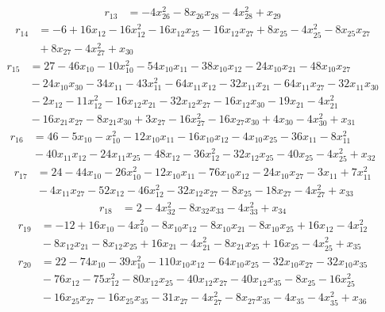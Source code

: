 \[\begin{aligned}
r_{13}&=-4x_{26}^{2}-8x_{26}x_{28}-4x_{28}^{2}+x_{29}
\end{aligned}\]
\[\begin{aligned}
r_{14}&=-6+16x_{12}-16x_{12}^{2}-16x_{12}x_{25}-16x_{12}x_{27}+8x_{25}-4x_{25}^{2}-8x_{25}x_{27}\\
&{}+8x_{27}-4x_{27}^{2}+x_{30}
\end{aligned}\]
\[\begin{aligned}
r_{15}&=27-46x_{10}-10x_{10}^{2}-54x_{10}x_{11}-38x_{10}x_{12}-24x_{10}x_{21}-48x_{10}x_{27}\\
&{}-24x_{10}x_{30}-34x_{11}-43x_{11}^{2}-64x_{11}x_{12}-32x_{11}x_{21}-64x_{11}x_{27}-32x_{11}x_{30}\\
&{}-2x_{12}-11x_{12}^{2}-16x_{12}x_{21}-32x_{12}x_{27}-16x_{12}x_{30}-19x_{21}-4x_{21}^{2}\\
&{}-16x_{21}x_{27}-8x_{21}x_{30}+3x_{27}-16x_{27}^{2}-16x_{27}x_{30}+4x_{30}-4x_{30}^{2}+x_{31}
\end{aligned}\]
\[\begin{aligned}
r_{16}&=46-5x_{10}-x_{10}^{2}-12x_{10}x_{11}-16x_{10}x_{12}-4x_{10}x_{25}-36x_{11}-8x_{11}^{2}\\
&{}-40x_{11}x_{12}-24x_{11}x_{25}-48x_{12}-36x_{12}^{2}-32x_{12}x_{25}-40x_{25}-4x_{25}^{2}+x_{32}
\end{aligned}\]
\[\begin{aligned}
r_{17}&=24-44x_{10}-26x_{10}^{2}-12x_{10}x_{11}-76x_{10}x_{12}-24x_{10}x_{27}-3x_{11}+7x_{11}^{2}\\
&{}-4x_{11}x_{27}-52x_{12}-46x_{12}^{2}-32x_{12}x_{27}-8x_{25}-18x_{27}-4x_{27}^{2}+x_{33}
\end{aligned}\]
\[\begin{aligned}
r_{18}&=2-4x_{32}^{2}-8x_{32}x_{33}-4x_{33}^{2}+x_{34}
\end{aligned}\]
\[\begin{aligned}
r_{19}&=-12+16x_{10}-4x_{10}^{2}-8x_{10}x_{12}-8x_{10}x_{21}-8x_{10}x_{25}+16x_{12}-4x_{12}^{2}\\
&{}-8x_{12}x_{21}-8x_{12}x_{25}+16x_{21}-4x_{21}^{2}-8x_{21}x_{25}+16x_{25}-4x_{25}^{2}+x_{35}
\end{aligned}\]
\[\begin{aligned}
r_{20}&=22-74x_{10}-39x_{10}^{2}-110x_{10}x_{12}-64x_{10}x_{25}-32x_{10}x_{27}-32x_{10}x_{35}\\
&{}-76x_{12}-75x_{12}^{2}-80x_{12}x_{25}-40x_{12}x_{27}-40x_{12}x_{35}-8x_{25}-16x_{25}^{2}\\
&{}-16x_{25}x_{27}-16x_{25}x_{35}-31x_{27}-4x_{27}^{2}-8x_{27}x_{35}-4x_{35}-4x_{35}^{2}+x_{36}
\end{aligned}\]
